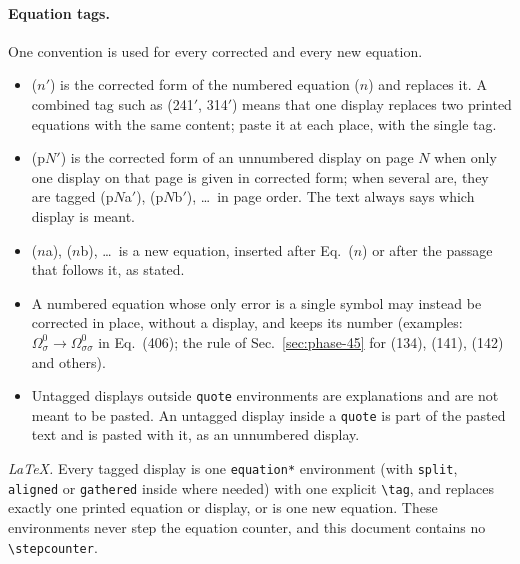 \documentclass[11pt]{article}
\begin{document}
\paragraph{Equation tags.} One convention is used for every corrected and every new equation.
\begin{itemize}
\item ($n'$) is the corrected form of the numbered equation ($n$) and replaces it. A combined tag such
as (241$'$, 314$'$) means that one display replaces two printed equations with the same content; paste
it at each place, with the single tag.
\item (p$N'$) is the corrected form of an unnumbered display on page $N$ when only one display on that
page is given in corrected form; when several are, they are tagged (p$N$a$'$), (p$N$b$'$), \ldots\ in
page order. The text always says which display is meant.
\item ($n$a), ($n$b), \ldots\ is a new equation, inserted after Eq.~($n$) or after the passage that
follows it, as stated.
\item A numbered equation whose only error is a single symbol may instead be corrected in place, without
a display, and keeps its number (examples: $\Omega^0_\sigma\to\Omega^0_{\sigma\sigma}$ in Eq.~(406); the
rule of Sec.~\ref{sec:phase-45} for (134), (141), (142) and others).
\item Untagged displays outside \texttt{quote} environments are explanations and are not meant to be
pasted. An untagged display inside a \texttt{quote} is part of the pasted text and is pasted with it, as
an unnumbered display.
\end{itemize}
\emph{LaTeX.} Every tagged display is one \verb|equation*| environment (with \verb|split|,
\verb|aligned| or \verb|gathered| inside where needed) with one explicit \verb|\tag|, and replaces
exactly one printed equation or display, or is one new equation. These environments never step the
equation counter, and this document contains no \verb|\stepcounter|.
\end{document}

